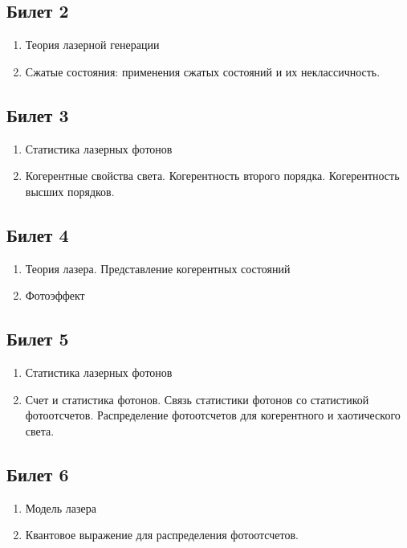 \subsection*{Билет 2} 
\begin{enumerate}
\item Теория лазерной генерации
\item Сжатые состояния: применения сжатых состояний и их
  неклассичность. 
\end{enumerate}

\subsection*{Билет 3} 
\begin{enumerate}
\item Статистика лазерных фотонов
\item Когерентные свойства света.
 Когерентность второго порядка.
 Когерентность высших порядков.
\end{enumerate}

\subsection*{Билет 4} 
\begin{enumerate}
\item Теория лазера. Представление когерентных состояний
\item Фотоэффект
\end{enumerate}

\subsection*{Билет 5} 
\begin{enumerate}
\item Статистика лазерных фотонов
\item Счет и статистика фотонов.
Связь статистики фотонов со статистикой фотоотсчетов.
Распределение фотоотсчетов для когерентного и хаотического
  света.
\end{enumerate}

\subsection*{Билет 6} 
\begin{enumerate}
\item Модель лазера
\item Квантовое выражение для распределения фотоотсчетов.
\end{enumerate}

